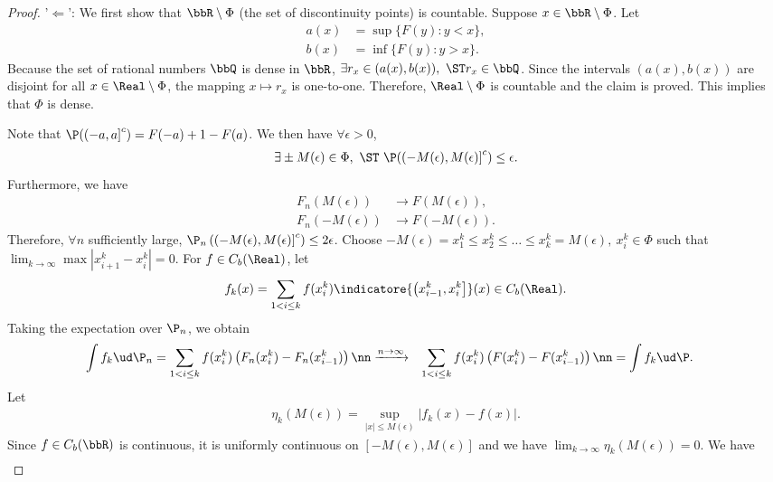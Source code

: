 \documentclass[../aipt.tex]{subfiles}
\begin{document}
\begin{proof}
'$\Leftarrow$': We first show that $\bbR \setminus \Phi$ (the set of discontinuity points) is countable. Suppose $x \in \bbR \setminus \Phi$. Let 
\begin{align*}
a(x) &= \sup \{F(y) : y < x \}, \\
b(x) &= \inf \{F(y) : y > x \}.
\end{align*}
Because the set of rational numbers $\bbQ$ is dense in $\bbR$, $\exists r_x \in (a(x), b(x)), \ \ST r_x \in \bbQ$. Since the intervals $(a(x),b(x))$ are disjoint for all $x\in\Real\setminus\Phi$, the mapping $x \mapsto r_x$ is one-to-one. Therefore, $\Real\setminus\Phi$ is countable and the claim is proved. This implies that $\Phi$ is dense.

Note that $\P({\left(-a, a\right]^c}) = F(-a) + 1 - F(a)$. We then have $\forall \epsilon > 0$,
\begin{align*}
\exists \pm M(\epsilon)\in \Phi, \ \ST\ \P({\left(-M(\epsilon), M(\epsilon)\right]^c}) \leq \epsilon.
\end{align*}
Furthermore, we have
\begin{align*}
F_n(M(\epsilon)) &\to F(M(\epsilon)), \\
F_n(-M(\epsilon)) &\to F(-M(\epsilon)).
\end{align*}
Therefore, $\forall n$ sufficiently large, $\P_n \left({\left(-M(\epsilon), M(\epsilon)\right]^c}\right) \leq 2 \epsilon$. Choose $-M(\epsilon) = x_1^k \leq x_2^k \leq \ldots \leq x_k^k = M(\epsilon), \ x_i^k \in \Phi$ such that $\lim_{k \to \infty} \max|x_{i+1}^k - x_i^k| = 0$. For $f\in C_b(\Real)$, let
\begin{align*}
f_k(x) 
= \sum_{1 < i \leq k} f(x_i^k) \indicatore{\left( x_{i-1}^k, x_i^k\right]}(x) \in C_b(\Real).
\end{align*}
Taking the expectation over $\P_n$, we obtain
\begin{align}
\int f_k \ud\P_n 
&= \sum_{1 < i \leq k} f(x_i^k) \left(F_n(x_i^k) - F_n(x_{i-1}^k)\right) \nn
\xrightarrow{n\to\infty}& \sum_{1 < i \leq k} f(x_i^k) \left(F(x_i^k) - F(x_{i-1}^k)\right) \nn
&= \int f_k \ud\P. \label{wk9:convd_if_conv_in_cdf_1}
\end{align}
Let
\begin{align*}
\eta_k(M(\epsilon)) = \sup_{|x| \leq M(\epsilon)} \left| f_k(x) - f(x) \right|.
\end{align*}
Since $f \in C_b(\bbR)$ is continuous, it is uniformly continuous on $[-M(\epsilon),M(\epsilon)]$ and we have $\lim_{k \to \infty} \eta_k(M(\epsilon)) = 0$. We have
\begin{align}

\end{align}
\end{proof}
\end{document}
